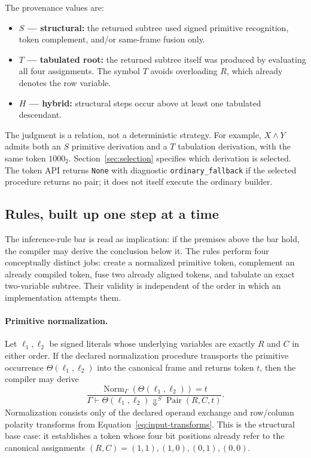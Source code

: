\documentclass[10pt]{article}
\newcommand{\Pair}{\operatorname{Pair}}
\theoremstyle{plain}
\theoremstyle{definition}
\theoremstyle{remark}
\begin{document}
The provenance values are:
\begin{itemize}
 \item \textbf{$S$ --- structural:} the returned subtree used signed primitive recognition, token complement, and/or same-frame fusion only.
 \item \textbf{$T$ --- tabulated root:} the returned subtree itself was produced by evaluating all four assignments. The symbol $T$ avoids overloading $R$, which already denotes the row variable.
 \item \textbf{$H$ --- hybrid:} structural steps occur above at least one tabulated descendant.
\end{itemize}
The judgment is a relation, not a deterministic strategy. For example, $X\land Y$ admits both an $S$ primitive derivation and a $T$ tabulation derivation, with the same token $1000_2$. Section~\ref{sec:selection} specifies which derivation is selected. The token API returns \texttt{None} with diagnostic \texttt{ordinary\_fallback} if the selected procedure returns no pair; it does not itself execute the ordinary builder.

\subsection{Rules, built up one step at a time}

The inference-rule bar is read as implication: if the premises above the bar hold, the compiler may derive the conclusion below it. The rules perform four conceptually distinct jobs: create a normalized primitive token, complement an already compiled token, fuse two already aligned tokens, and tabulate an exact two-variable subtree. Their validity is independent of the order in which an implementation attempts them.

\paragraph{Primitive normalization.}
Let $\ell_1,\ell_2$ be signed literals whose underlying variables are exactly $R$ and $C$ in either order. If the declared normalization procedure transports the primitive occurrence $\Theta(\ell_1,\ell_2)$ into the canonical frame and returns token $t$, then the compiler may derive
\[
\frac{
  \operatorname{Norm}_{\Gamma}(\Theta(\ell_1,\ell_2))=t
}{
  \Gamma\vdash \Theta(\ell_1,\ell_2)\Downarrow^S \Pair(R,C,t)
}.
\]
Normalization consists only of the declared operand exchange and row/column polarity transforms from Equation~\eqref{eq:input-transforms}. This is the structural base case: it establishes a token whose four bit positions already refer to the canonical assignments $(R,C)=(1,1),(1,0),(0,1),(0,0)$.
\end{document}
